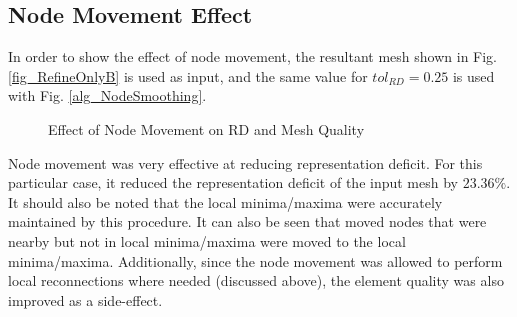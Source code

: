 \subsection{Node Movement Effect}
In order to show the effect of node movement, the resultant mesh shown
in Fig. \ref{fig_RefineOnlyB} is used as input, and the same value for
$tol_{RD} = 0.25$ is used with Fig. \ref{alg_NodeSmoothing}.

\begin{figure}[h!]
  \begin{center}
 
  \caption{Effect of Node Movement on RD and Mesh Quality}
  \label{fig_NodeSmoothing}

  \end{center}
\end{figure}

Node movement was very effective at reducing representation deficit.
For this particular case, it reduced the representation deficit of the
input mesh by $23.36\%$. It should also be noted that the local
minima/maxima were accurately maintained by this procedure. It can also
be seen that moved nodes that were nearby but not in local minima/maxima
were moved to the local minima/maxima.  Additionally, since the node
movement was allowed to perform local reconnections where needed
(discussed above), the element quality was also improved as a
side-effect.

